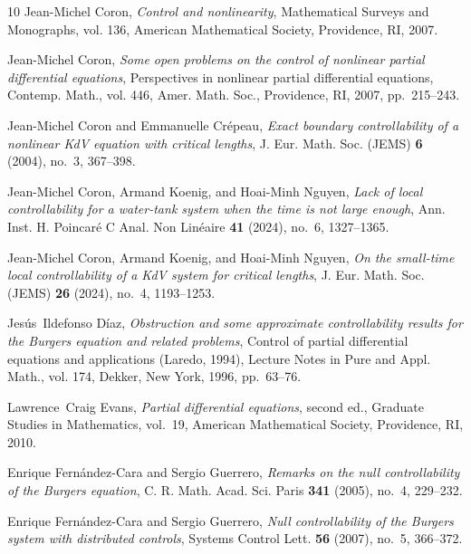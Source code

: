 \documentclass[11pt, reqno]{amsart}
\theoremstyle{plain}
\numberwithin{equation}{section}
\begin{document}
\begin{thebibliography}{10}
Jean-Michel Coron, \emph{Control and nonlinearity}, Mathematical Surveys and Monographs,
  vol. 136, American Mathematical Society, Providence, RI, 2007. 

Jean-Michel Coron, \emph{Some open problems on the control of nonlinear partial
  differential equations}, Perspectives in nonlinear partial differential
  equations, Contemp. Math., vol. 446, Amer. Math. Soc., Providence, RI, 2007,
  pp.~215--243. 

Jean-Michel Coron and Emmanuelle Cr\'epeau, \emph{Exact boundary
  controllability of a nonlinear {K}d{V} equation with critical lengths}, J.
  Eur. Math. Soc. (JEMS) \textbf{6} (2004), no.~3, 367--398. 

Jean-Michel Coron, Armand Koenig, and Hoai-Minh Nguyen, \emph{Lack of local
  controllability for a water-tank system when the time is not large enough},
  Ann. Inst. H. Poincar\'e{} C Anal. Non Lin\'eaire \textbf{41} (2024), no.~6,
  1327--1365. 

Jean-Michel Coron, Armand Koenig, and Hoai-Minh Nguyen, \emph{On the small-time local controllability of a {K}d{V} system for
  critical lengths}, J. Eur. Math. Soc. (JEMS) \textbf{26} (2024), no.~4,
  1193--1253. 

Jesús~Ildefonso Dí­az, \emph{Obstruction and some approximate controllability
  results for the {B}urgers equation and related problems}, Control of partial
  differential equations and applications ({L}aredo, 1994), Lecture Notes in
  Pure and Appl. Math., vol. 174, Dekker, New York, 1996, pp.~63--76.

Lawrence~Craig Evans, \emph{Partial differential equations}, second ed., Graduate
  Studies in Mathematics, vol.~19, American Mathematical Society, Providence,
  RI, 2010. 

Enrique Fern\'andez-Cara and Sergio Guerrero, \emph{Remarks on the null
  controllability of the {B}urgers equation}, C. R. Math. Acad. Sci. Paris
  \textbf{341} (2005), no.~4, 229--232. 

Enrique Fern\'andez-Cara and Sergio Guerrero, \emph{Null controllability of the {B}urgers system with distributed
  controls}, Systems Control Lett. \textbf{56} (2007), no.~5, 366--372.


\end{thebibliography}
\end{document}
